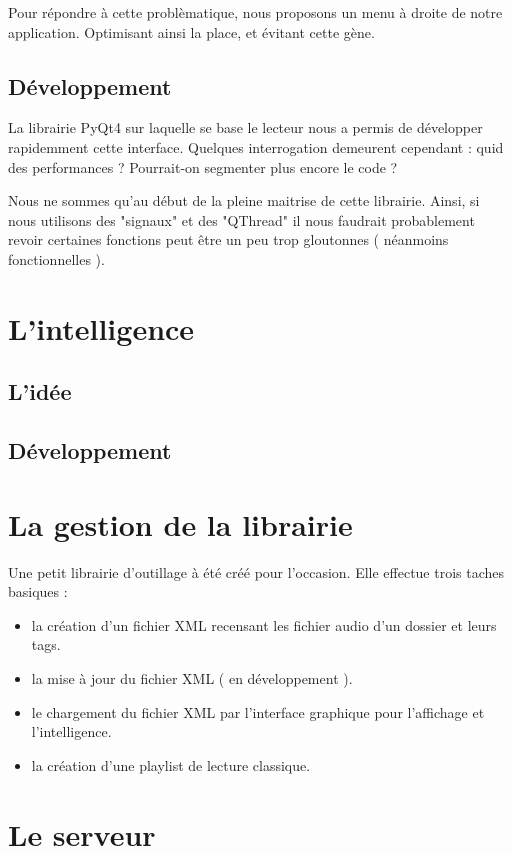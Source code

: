 \documentclass{report}
\begin{document}
Pour répondre à cette problèmatique, nous proposons un menu à droite de notre application. Optimisant ainsi la place, et évitant cette gène.
\subsection*{Développement}
La librairie PyQt4 sur laquelle se base le lecteur nous a permis de développer rapidemment cette interface. Quelques interrogation demeurent cependant : quid des performances ? Pourrait-on segmenter plus encore le code ?

Nous ne sommes qu'au début de la pleine maitrise de cette librairie. Ainsi, si nous utilisons des "signaux" et des "QThread" il nous faudrait probablement revoir certaines fonctions peut être un peu trop gloutonnes ( néanmoins fonctionnelles ).

\section*{L'intelligence}
\subsection*{L'idée}


\subsection*{Développement}


\section*{La gestion de la librairie}

Une petit librairie d'outillage à été créé pour l'occasion. Elle effectue trois taches basiques :
\begin{itemize}
\item la création d'un fichier XML recensant les fichier audio d'un dossier et leurs tags.
\item la mise à jour du fichier XML ( en développement ).
\item le chargement du fichier XML par l'interface graphique pour l'affichage et l'intelligence.
\item la création d'une playlist de lecture classique.
\end{itemize}

\section*{Le serveur}
\end{document}
